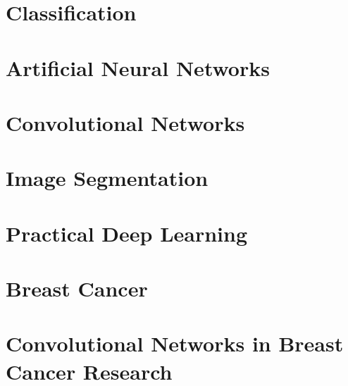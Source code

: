 \section{Classification}
\label{sec:Classification}


\section{Artificial Neural Networks}
\label{sec:ANNs}


\section{Convolutional Networks}
\label{sec:ConvNets}


\section{Image Segmentation}
\label{sec:Segmentation}
 

\section{Practical Deep Learning}
\label{sec:PracticalDL}


\section{Breast Cancer}
\label{sec:BreastCancer}


\section{Convolutional Networks in Breast Cancer Research}
\label{sec:BreastCancerConvNets}

